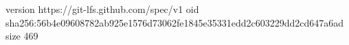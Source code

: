 version https://git-lfs.github.com/spec/v1
oid sha256:56b4e09608782ab925e1576d73062fe1845e35331edd2c603229dd2cd647a6ad
size 469
